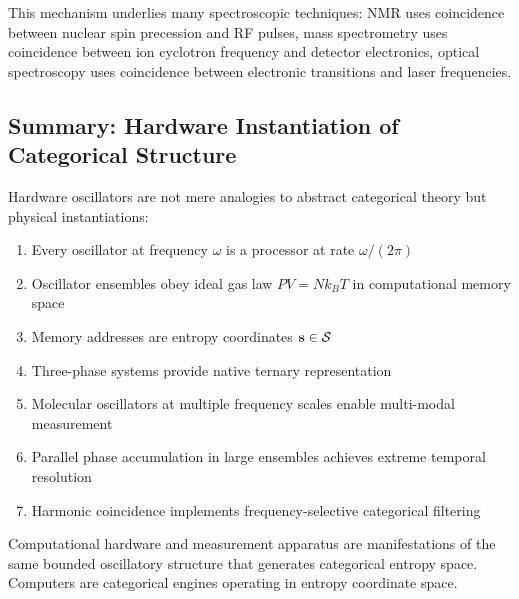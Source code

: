 This mechanism underlies many spectroscopic techniques: NMR uses coincidence between nuclear spin precession and RF pulses, mass spectrometry uses coincidence between ion cyclotron frequency and detector electronics, optical spectroscopy uses coincidence between electronic transitions and laser frequencies.

\subsection{Summary: Hardware Instantiation of Categorical Structure}

Hardware oscillators are not mere analogies to abstract categorical theory but physical instantiations:
\begin{enumerate}
\item Every oscillator at frequency $\omega$ is a processor at rate $\omega/(2\pi)$
\item Oscillator ensembles obey ideal gas law $PV = Nk_BT$ in computational memory space
\item Memory addresses are entropy coordinates $\mathbf{s} \in \mathcal{S}$
\item Three-phase systems provide native ternary representation
\item Molecular oscillators at multiple frequency scales enable multi-modal measurement
\item Parallel phase accumulation in large ensembles achieves extreme temporal resolution
\item Harmonic coincidence implements frequency-selective categorical filtering
\end{enumerate}

Computational hardware and measurement apparatus are manifestations of the same bounded oscillatory structure that generates categorical entropy space. Computers are categorical engines operating in entropy coordinate space.
